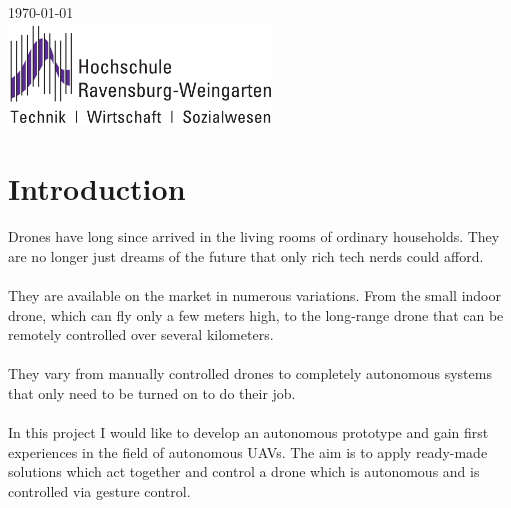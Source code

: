 \documentclass[a4paper,11pt,singlespacing]{article}
\begin{document}
\begin{titlepage}
	
	
	{\large \today}\\[5cm] %
	
	
	
	\includegraphics[width=7cm]{images/logo.png} %
	
	
	\vfill %
	
\end{titlepage}


\tableofcontents
\pagebreak


\section{Introduction}
Drones have long since arrived in the living rooms of ordinary households. They are no longer just dreams of the future that only rich tech nerds could afford.
\\\\
They are available on the market in numerous variations.
From the small indoor drone, which can fly only a few meters high, to the long-range drone that can be remotely controlled over several kilometers.
\\\\
They vary from manually controlled drones to completely autonomous systems that only need to be turned on to do their job.
\\\\
In this project I would like to develop an autonomous prototype and gain first experiences in the field of autonomous UAVs.
The aim is to apply ready-made solutions which act together and control a drone which is autonomous and is controlled via gesture control.
\end{document}
